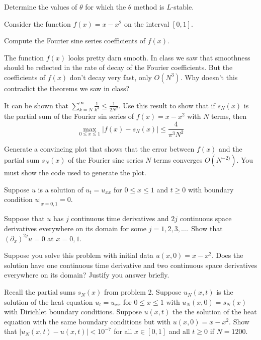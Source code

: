 \documentclass[minion]{homework}
\begin{document}
\begin{problems}

\problem  Determine the values of $\theta$ for which the $\theta$ method 
is $L$-stable.

\problem Consider the function $f(x)=x-x^2$ on the interval $[0,1]$.
\begin{subproblems}
\item  Compute the Fourier sine series coefficients of
$f(x)$.
\item The function $f(x)$ looks pretty darn smooth. In class
we saw that smoothness should be reflected in the rate of decay
of the Fourier coefficients.  But the coefficients of $f(x)$ don't decay
very fast, only $O(N^3)$.  
Why doesn't this contradict the theorems we saw in class?
\item It can be shown that $\sum_{k=N}^\infty \frac{1}{k^3}\le \frac{1}{2N^2}$.
Use this result to show that if $s_N(x)$ is the partial sum of the 
Fourier sin series of $f(x)=x-x^2$ with $N$ terms, then 
\[
\max_{0\le x\le 1} |f(x)-s_N(x)|\le \frac{4}{\pi^3 N^2}
\]

\item Generate a convincing plot that shows that the error
between $f(x)$ and the partial sum $s_N(x)$ of the Fourier sine series 
$N$ terms converges $O(N^{-2)})$.  You must show the code used to generate the plot.
\end{subproblems}

\problem Suppose $u$ is a solution of $u_t=u_{xx}$ for $0\le x \le 1$
and $t\ge 0$ with boundary condition $u|_{x=0,1}=0$.
\begin{subproblems}
\item
Suppose that $u$ has $j$ continuous time derivatives
and $2j$ continuous space derivatives everywhere on its domain
for some $j=1,2,3,\ldots$.  Show that $(\partial_x)^{2j} u=0$ at $x=0,1$.
\item Suppose you solve this problem with initial data $u(x,0)=x-x^2$.
Does the solution have one continuous time derivative and two
continuous space derivatives everywhere on its domain? Justify
you answer briefly.
\end{subproblems}

\problem Recall the partial sums $s_N(x)$ from problem 2. 
Suppose $u_N(x,t)$ is the solution of the heat equation $u_t=u_{xx}$
for $0\le x\le 1$ with $u_N(x,0)=s_N(x)$ with Dirichlet boundary conditions.
Suppose $u(x,t)$ the the solution of the heat equation with the same boundary
conditions but with $u(x,0)=x-x^2$.  Show that $|u_N(x,t)-u(x,t)|<10^{-7}$
for all $x\in[0,1]$ and all $t\ge 0$ if $N=1200$.



\end{problems}
\end{document}
